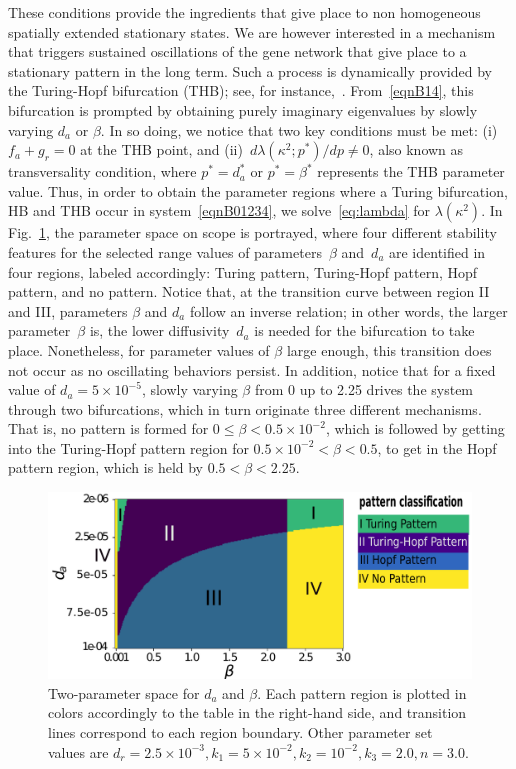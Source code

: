 \documentclass[%
 preprint,
 aip, 
 amsmath,amssymb,
]{revtex4-2}
\begin{document}
These conditions provide the ingredients that give place to non homogeneous spatially extended stationary states. We are however interested in a mechanism that triggers sustained oscillations of the gene network that give place to a stationary pattern in the long term. Such a process is dynamically provided by the Turing-Hopf bifurcation (THB); see, for instance,~\cite{Castillo2016, liu}. From~\eqref{eqnB14}, this bifurcation is prompted by obtaining purely imaginary eigenvalues by slowly varying $d_a$ or $\beta$. In so doing, we notice that two key conditions must be met: (i)~$f_a + g_r=0$ at the THB point, and (ii)~$d\lambda(\kappa^2;p^*)/dp\neq0$, also known as transversality condition, where $p^*=d_a^*$ or $p^*=\beta^*$ represents the THB parameter value. Thus, in order to obtain the parameter regions where a Turing bifurcation, HB and THB occur in system~\eqref{eqnB01234}, we solve~\eqref{eq:lambda} for $\lambda(\kappa^2)$. In Fig.~\ref{FigB01}, the parameter space on scope is portrayed, where four different stability features for the selected range values of parameters~$\beta$ and~$d_a$ are identified in four regions, labeled accordingly: Turing pattern, Turing-Hopf pattern, Hopf pattern, and no pattern. Notice that, at the transition curve between region II and III, parameters $\beta$ and $d_a$ follow an inverse relation; in other words, the larger parameter~$\beta$ is, the lower diffusivity~$d_a$ is needed for the bifurcation to take place. Nonetheless, for parameter values of $\beta$ large enough, this transition does not occur as no oscillating behaviors persist. In addition, notice that for a fixed value of $d_a=5\times10^{-5}$, slowly varying $\beta$ from 0 up to 2.25 drives the system through two bifurcations, which in turn originate three different mechanisms. That is, no pattern is formed for $0\leq\beta < 0.5\times10^{-2}$, which is followed by getting into the Turing-Hopf pattern region for $ 0.5\times10^{-2}<\beta<0.5$, to get in the Hopf pattern region, which is held by $ 0.5<\beta< 2.25$.

\begin{figure}[t!]
	\centering
	\includegraphics[width=5.0in]{ApFigure01}
	\caption{Two-parameter space for $d_a$ and $\beta$. Each pattern region is plotted in colors accordingly to the table in the right-hand side, and transition lines correspond to each region boundary. Other parameter set values are $d_r = 2.5\times10^{-3}, k_1 = 5\times10^{-2}, k_2=10^{-2}, k_3=2.0, n=3.0$.}
	\label{FigB01}
\end{figure}
\end{document}
